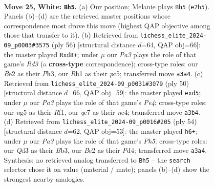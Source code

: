 \documentclass[11pt]{article}
\begin{document}
\clearpage

\begin{figure}[p]\centering
\begin{subfigure}{0.46\textwidth}\centering
\resizebox{\linewidth}{!}{%
\newchessgame
\chessboard[
  setfen={4r1k1/p1ppq1pp/5p2/6n1/1pPP4/P2Q4/2P1BP1P/1R4K1 w - - 1 25},
  showmover=false,
  pgfstyle=straightmove, color=movearrow, markmove={e2-h5}
]}
\caption{}
\end{subfigure}\hfill
\begin{subfigure}{0.46\textwidth}\centering
\resizebox{\linewidth}{!}{%
\newchessgame
\chessboard[
  setfen={3r2k1/5pbp/p3q1p1/2p1p3/4P3/2pR1Q1P/5PP1/6K1 w - - 0 29},
  showmover=false,
  pgfstyle=straightmove, color=movearrow, markmove={d3-d8}
]}
\caption{}
\end{subfigure}
\\[4pt]
\begin{subfigure}{0.46\textwidth}\centering
\resizebox{\linewidth}{!}{%
\newchessgame
\chessboard[
  setfen={2r1q1k1/pp3ppp/4p3/3pP3/2nPP1B1/5Q2/6PP/5RK1 w - - 2 26},
  showmover=false,
  pgfstyle=straightmove, color=movearrow, markmove={e4-d5}
]}
\caption{}
\end{subfigure}\hfill
\begin{subfigure}{0.46\textwidth}\centering
\resizebox{\linewidth}{!}{%
\newchessgame
\chessboard[
  setfen={3r4/3q1pkp/pn4p1/1p5P/3P4/1B3Q2/PP3PP1/4R1K1 w - - 0 28},
  showmover=false,
  pgfstyle=straightmove, color=movearrow, markmove={h5-h6}
]}
\caption{}
\end{subfigure}
\caption{\textbf{Move 25, White: \texttt{Bh5}.} (a) Our position; Melanie plays \texttt{Bh5} (\texttt{e2h5}). Panels (b)--(d) are the retrieved master positions whose correspondence most drove this move (highest QAP objective among those that transfer to it). (b) Retrieved from \texttt{lichess\_elite\_2024-09\_p0003\#3575} (ply 56) [structural distance $d$=64, QAP obj=66]: the master played \texttt{Rxd8+}; under $\mu$ our \emph{Pa3} plays the role of that game's \emph{Rd3} (a \textbf{cross-type} correspondence); cross-type roles: our \emph{B}e2 as their \emph{P}h3, our \emph{R}b1 as their \emph{p}c5; transferred move \texttt{a3a4}. (c) Retrieved from \texttt{lichess\_elite\_2024-09\_p0031\#3079} (ply 50) [structural distance $d$=66, QAP obj=59]: the master played \texttt{exd5}; under $\mu$ our \emph{Pa3} plays the role of that game's \emph{Pe4}; cross-type roles: our \emph{n}g5 as their \emph{R}f1, our \emph{q}e7 as their \emph{n}c4; transferred move \texttt{a3b4}. (d) Retrieved from \texttt{lichess\_elite\_2024-09\_p0016\#205} (ply 54) [structural distance $d$=62, QAP obj=53]: the master played \texttt{h6+}; under $\mu$ our \emph{Pa3} plays the role of that game's \emph{Ph5}; cross-type roles: our \emph{Q}d3 as their \emph{B}b3, our \emph{B}e2 as their \emph{P}d4; transferred move \texttt{a3a4}. Synthesis: no retrieved analog transferred to \texttt{Bh5} -- the \texttt{search} selector chose it on value (material / mate); panels (b)--(d) show the strongest nearby analogies.}
\label{fig:thought-m48}
\end{figure}
\end{document}
